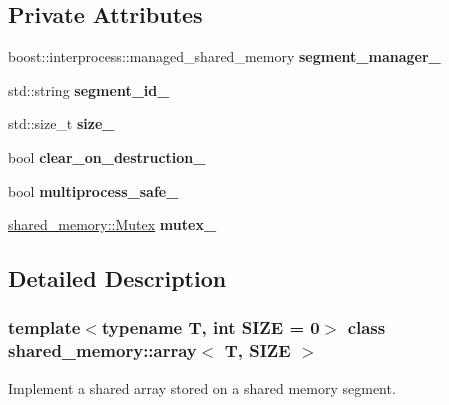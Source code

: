 \subsection*{Private Attributes}
\begin{DoxyCompactItemize}
\item 
\mbox{\label{classshared__memory_1_1array_a43c56477481ae684932b6a03b64d7b67}} 
boost\+::interprocess\+::managed\+\_\+shared\+\_\+memory {\bfseries segment\+\_\+manager\+\_\+}
\item 
\mbox{\label{classshared__memory_1_1array_a25a07e97c454f8fb122eb092ab29812c}} 
std\+::string {\bfseries segment\+\_\+id\+\_\+}
\item 
\mbox{\label{classshared__memory_1_1array_a1b47b48a2779e766a80403f47404876a}} 
std\+::size\+\_\+t {\bfseries size\+\_\+}
\item 
\mbox{\label{classshared__memory_1_1array_afb6fcb395ac52cb9eaaef2882b623d23}} 
bool {\bfseries clear\+\_\+on\+\_\+destruction\+\_\+}
\item 
\mbox{\label{classshared__memory_1_1array_a7051346ccb28372b2ea5587714113079}} 
bool {\bfseries multiprocess\+\_\+safe\+\_\+}
\item 
\mbox{\label{classshared__memory_1_1array_afaf6604cf5e2c380f86679e1515e6674}} 
\hyperlink{classshared__memory_1_1Mutex}{shared\+\_\+memory\+::\+Mutex} {\bfseries mutex\+\_\+}
\end{DoxyCompactItemize}


\subsection{Detailed Description}
\subsubsection*{template$<$typename T, int S\+I\+ZE = 0$>$\newline
class shared\+\_\+memory\+::array$<$ T, S\+I\+Z\+E $>$}

Implement a shared array stored on a shared memory segment. 

